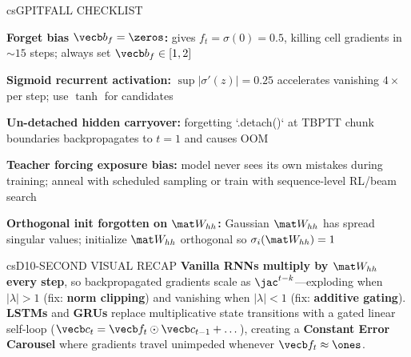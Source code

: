 \documentclass[../../../../master.tex]{subfiles}
\begin{document}
\begin{cscolumns}
\begin{cscard}{csG}{PITFALL CHECKLIST}
  \begin{csbul}
    \item \textbf{Forget bias $\vecb b_f = \zeros$:} gives $f_t = \sigma(0) = 0.5$, killing cell gradients in $\sim 15$ steps; always set $\vecb b_f \in [1, 2]$
    \item \textbf{Sigmoid recurrent activation:} $\sup|\sigma'(z)| = 0.25$ accelerates vanishing $4\times$ per step; use $\tanh$ for candidates
    \item \textbf{Un-detached hidden carryover:} forgetting `.detach()` at TBPTT chunk boundaries backpropagates to $t=1$ and causes OOM
    \item \textbf{Teacher forcing exposure bias:} model never sees its own mistakes during training; anneal with scheduled sampling or train with sequence-level RL/beam search
    \item \textbf{Orthogonal init forgotten on $\mat W_{hh}$:} Gaussian $\mat W_{hh}$ has spread singular values; initialize $\mat W_{hh}$ orthogonal so $\sigma_i(\mat W_{hh})=1$
  \end{csbul}
\end{cscard}

\begin{cscard}{csD}{10-SECOND VISUAL RECAP}
  \sffamily\footnotesize
  \textbf{Vanilla RNNs multiply by $\mat W_{hh}$ every step}, so backpropagated gradients scale as $\jac^{t-k}$---exploding when $|\lambda|>1$ (fix: \textbf{norm clipping}) and vanishing when $|\lambda|<1$ (fix: \textbf{additive gating}). \textbf{LSTMs} and \textbf{GRUs} replace multiplicative state transitions with a gated linear self-loop ($\vecb c_t = \vecb f_t\odot\vecb c_{t-1} + \dots$), creating a \textbf{Constant Error Carousel} where gradients travel unimpeded whenever $\vecb f_t\approx \ones$.
\end{cscard}
\end{cscolumns}

\csend
\end{document}
